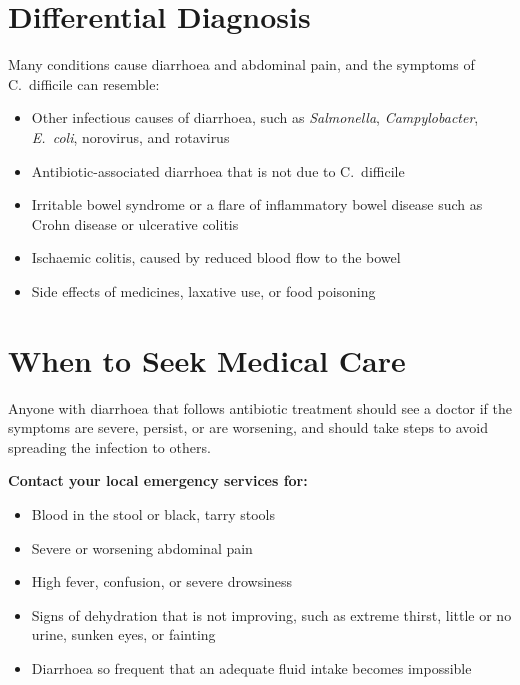 \section*{Differential Diagnosis}
Many conditions cause diarrhoea and abdominal pain, and the symptoms of C.\ difficile can resemble:
\begin{itemize}
    \item Other infectious causes of diarrhoea, such as \textit{Salmonella}, \textit{Campylobacter}, \textit{E.\ coli}, norovirus, and rotavirus
    \item Antibiotic-associated diarrhoea that is not due to C.\ difficile
    \item Irritable bowel syndrome or a flare of inflammatory bowel disease such as Crohn disease or ulcerative colitis
    \item Ischaemic colitis, caused by reduced blood flow to the bowel
    \item Side effects of medicines, laxative use, or food poisoning
\end{itemize}

\section*{When to Seek Medical Care}
Anyone with diarrhoea that follows antibiotic treatment should see a doctor if the symptoms are severe, persist, or are worsening, and should take steps to avoid spreading the infection to others.

\textbf{Contact your local emergency services for:}
\begin{itemize}
    \item Blood in the stool or black, tarry stools
    \item Severe or worsening abdominal pain
    \item High fever, confusion, or severe drowsiness
    \item Signs of dehydration that is not improving, such as extreme thirst, little or no urine, sunken eyes, or fainting
    \item Diarrhoea so frequent that an adequate fluid intake becomes impossible
\end{itemize}


